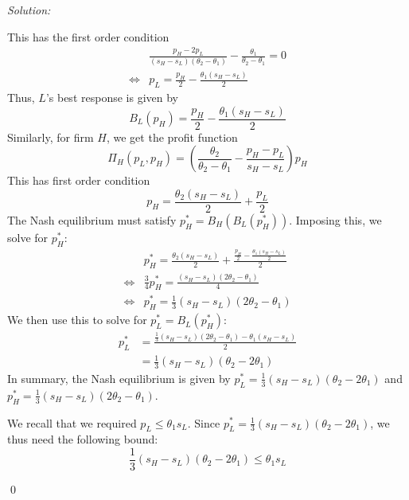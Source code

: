 \documentclass[12pt]{article}
\newenvironment{problem}[2][Problem]{\begin{trivlist}
\item[\hskip \labelsep {\bfseries #1}\hskip \labelsep {\bfseries #2.}]}{\end{trivlist}}
\newenvironment{sol}
    {\emph{Solution:}
    }
    {
    \qed
    }
\begin{document}
\begin{sol}
\begin{enumerate}[label=\alph*) ]
        This has the first order condition
        \begin{align*}
            &\frac{p_H - 2 p_L}{(s_H - s_L)(\theta_2 - \theta_1)} - \frac{\theta_1}{\theta_2 - \theta_1 } = 0\\
            \iff& p_L = \frac{p_H}{2} - \frac{\theta_1(s_H - s_L)}{2}
        \end{align*}
        Thus, $L$'s best response is given by
        \[B_L(p_H) =  \frac{p_H}{2} - \frac{\theta_1(s_H - s_L)}{2}\]
        Similarly, for firm $H$, we get the profit function
        \[\Pi_H(p_L, p_H) =\left(\frac{ \theta_2}{\theta_2 - \theta_1} - \frac{p_H - p_L}{s_H - s_L}  \right)p_H \]
        This has first order condition
        \[p_H = \frac{\theta_2 (s_H - s_L)}{2} + \frac{p_L}{2}\]
        The Nash equilibrium must satisfy $p_H^* = B_H(B_L(p_H^*))$. Imposing this, we solve for $p_H^*$:
        \begin{align*}
            &p_H^* = \frac{\theta_2 (s_H - s_L)}{2} + \frac{\frac{p_H}{2} - \frac{\theta_1(s_H - s_L)}{2}}{2}\\
            \iff& \frac{3}{4} p_H^* = \frac{(s_H - s_L)(2\theta_2 - \theta_1)}{4}\\
            \iff & p_H^* = \frac{1}{3} (s_H - s_L)(2\theta_2 - \theta_1)
        \end{align*}
        We then use this to solve for $p_L^* = B_L(p_H^*)$:
        \begin{align*}
            p_L^* &= \frac{\frac{1}{3} (s_H - s_L)(2\theta_2 - \theta_1) - \theta_1(s_H - s_L)}{2}\\
                &= \frac{1}{3} (s_H - s_L)(\theta_2 - 2 \theta_1)
        \end{align*}
        In summary, the Nash equilibrium is given by $p_L^* = \frac{1}{3} (s_H - s_L)(\theta_2 - 2 \theta_1)$ and $p_H^* =  \frac{1}{3} (s_H - s_L)(2\theta_2 - \theta_1)$.

        We recall that we required $p_L \leq \theta_1 s_L$. Since $p_L^* = \frac{1}{3} (s_H - s_L)(\theta_2 - 2 \theta_1)$, we thus need the following bound:
        \[\frac{1}{3} (s_H - s_L)(\theta_2 - 2 \theta_1) \leq \theta_1 s_L\]
    \end{enumerate}
\end{sol}
\begin{problem}{5}
\end{problem}
\end{document}
